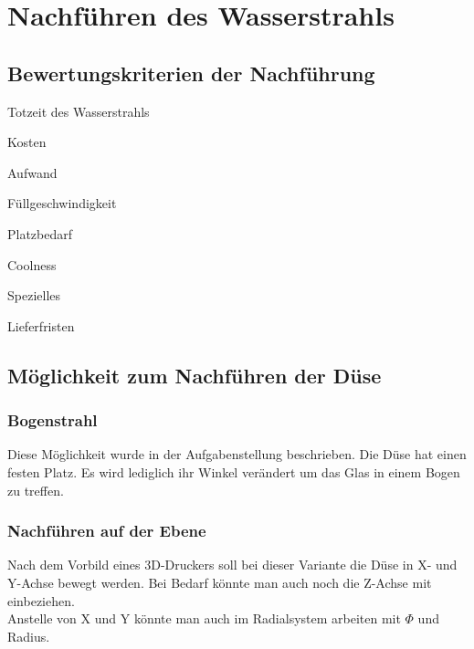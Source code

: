 \section{Nachführen des Wasserstrahls}



	\subsection{Bewertungskriterien der Nachführung}
		\begin{description}
			\item Totzeit des Wasserstrahls
			\item Kosten
			\item Aufwand
			\item Füllgeschwindigkeit
			\item Platzbedarf
			\item Coolness
			\item Spezielles 
			\item Lieferfristen
			
		\end{description}
	
	
	\subsection{Möglichkeit zum Nachführen der Düse}
		
		\subsubsection{Bogenstrahl}
		Diese Möglichkeit wurde in der Aufgabenstellung beschrieben. Die Düse hat einen festen Platz. Es wird lediglich ihr Winkel verändert um das Glas in einem Bogen zu treffen.
		
		\subsubsection{Nachführen auf der Ebene}
		Nach dem Vorbild eines 3D-Druckers soll bei dieser Variante die Düse in X- und Y-Achse bewegt werden. Bei Bedarf könnte man auch noch die Z-Achse mit einbeziehen.\\
		Anstelle von X und Y könnte man auch im Radialsystem arbeiten mit $\Phi$ und Radius.
		
